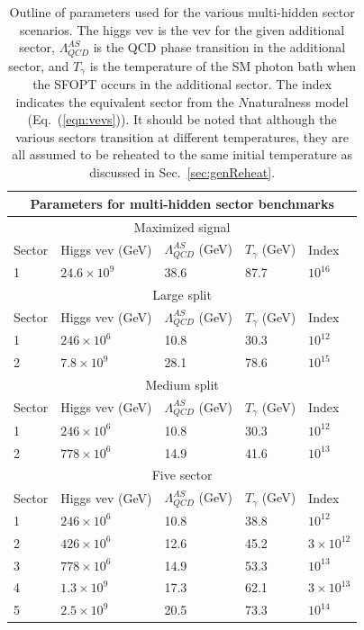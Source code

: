 \documentclass[nofootinbib,twocolumn,preprintnumbers]{revtex4-1}
\begin{document}
\begin{table}[t]
\begin{center}
\begin{tabular}{ |p{2cm}||p{3cm}|p{3cm}|p{3cm}|p{2cm}|  }
 \hline
 \multicolumn{5}{|c|}{Parameters for multi-hidden sector benchmarks} \\
 \hline
\multicolumn{5}{|c|}{Maximized signal} \\
 \hline
 Sector & Higgs vev (GeV) & $\Lambda^{AS}_{QCD}$ (GeV) & $T_\gamma$ (GeV) & Index\\
 \hline
 1 & $24.6 \times 10^{9}$ & 38.6 & 87.7 & $10^{16}$ \\
 \hline
\multicolumn{5}{|c|}{Large split} \\
 \hline
 Sector & Higgs vev (GeV) & $\Lambda^{AS}_{QCD}$ (GeV) & $T_\gamma$ (GeV) & Index\\
 \hline
 1 & $246 \times 10^6$  & 10.8 & 30.3 & $10^{12}$ \\
 2 & $7.8 \times 10^9$  & 28.1 & 78.6 & $10^{15}$ \\
 \hline
 \multicolumn{5}{|c|}{Medium split} \\
 \hline
 Sector & Higgs vev (GeV) & $\Lambda^{AS}_{QCD}$ (GeV) & $T_\gamma$ (GeV) & Index\\
 \hline
 1 & $246 \times 10^{6}$ & 10.8 & 30.3 & $10^{12}$ \\
 2 & $778 \times 10^6$  & 14.9 & 41.6 & $10^{13}$ \\
 \hline
 \multicolumn{5}{|c|}{Five sector} \\
 \hline
 Sector & Higgs vev (GeV) & $\Lambda^{AS}_{QCD}$ (GeV) & $T_\gamma$ (GeV) & Index\\
 \hline
 1 & $246 \times 10^6$ & 10.8 & 38.8 & $10^{12}$ \\
 2 & $426 \times 10^6$ & 12.6 & 45.2 & $3\times10^{12}$ \\
 3 & $778 \times 10^6$ & 14.9 & 53.3 & $10^{13}$ \\
 4 & $1.3 \times 10^9$ & 17.3 & 62.1 & $3\times10^{13}$ \\
 5 & $2.5 \times 10^9$ & 20.5 & 73.3 & $10^{14}$ \\
 \hline
\end{tabular}
\caption{Outline of parameters used for the various multi-hidden sector scenarios. The higgs vev is the vev for the given additional sector, $\Lambda^{AS}_{QCD}$ is the QCD phase transition in the additional sector, and $T_\gamma$ is the temperature of the SM photon bath when the SFOPT occurs in the additional sector. The index indicates the equivalent sector from the $N$naturalness model (Eq.~(\ref{eqn:vevs})). It should be noted that although the various sectors transition at different temperatures, they are all assumed to be reheated to the same initial temperature as discussed in Sec.~\ref{sec:genReheat}.}\label{tab:cases}
\end{center}
\end{table}
\end{document}
